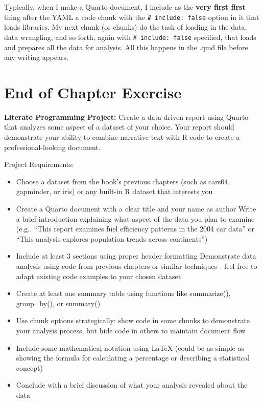 \documentclass[
  letterpaper,
]{book}
\begin{document}
Typically, when I make a Quarto document, I include as the \textbf{very
first first} thing after the YAML a code chunk with the
\texttt{\#\textbar{}\ include:\ false} option in it that loads
libraries. My next chunk (or chunks) do the task of loading in the data,
data wrangling, and so forth, again with
\texttt{\#\textbar{}\ include:\ false} specified, that loads and
prepares all the data for analysis. All this happens in the .qmd file
before any writing appears.

\section{End of Chapter Exercise}\label{end-of-chapter-exercise}

\textbf{Literate Programming Project:} Create a data-driven report using
Quarto that analyzes some aspect of a dataset of your choice. Your
report should demonstrate your ability to combine narrative text with R
code to create a professional-looking document.

Project Requirements:

\begin{itemize}
\item
  Choose a dataset from the book's previous chapters (such as cars04,
  gapminder, or iris) or any built-in R dataset that interests you
\item
  Create a Quarto document with a clear title and your name as author
  Write a brief introduction explaining what aspect of the data you plan
  to examine (e.g., ``This report examines fuel efficiency patterns in
  the 2004 car data'' or ``This analysis explores population trends
  across continents'')
\item
  Include at least 3 sections using proper header formatting Demonstrate
  data analysis using code from previous chapters or similar techniques
  - feel free to adapt existing code examples to your chosen dataset
\item
  Create at least one summary table using functions like summarize(),
  group\_by(), or summary()
\item
  Use chunk options strategically: show code in some chunks to
  demonstrate your analysis process, but hide code in others to maintain
  document flow
\item
  Include some mathematical notation using LaTeX (could be as simple as
  showing the formula for calculating a percentage or describing a
  statistical concept)
\item
  Conclude with a brief discussion of what your analysis revealed about
  the data
\end{itemize}
\end{document}
